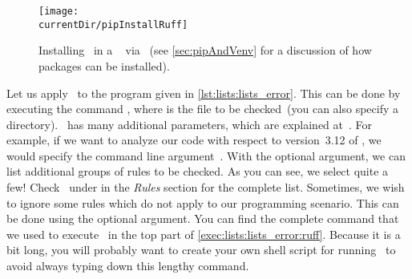 \begin{figure}%
\centering%
\texttt{[image: \\currentDir/pipInstallRuff]}%
\caption{Installing \ruff\ in a \ubuntu\  via \pip~(see \cref{sec:pipAndVenv} for a discussion of how packages can be installed).}%
\label{fig:pipInstallRuff}%
\end{figure}%
%
%
%
%
%
%
Let us apply \ruff\ to the program  given in \cref{lst:lists:lists_error}.
This can be done by executing the command , where  is the file to be checked~(you can also specify a directory).
\ruff\ has many additional parameters, which are explained at~\cite{PSF:TPPIP:R,M2022RAEFPLACFWIR}.
For example, if we want to analyze our code with respect to version~3.12 of \python, we would specify the command line argument~.
With the optional  argument, we can list additional groups of rules to be checked.
As you can see, we select quite a few!
Check~\cite{M2022RAEFPLACFWIR} under  in the \emph{Rules} section for the complete list.
Sometimes, we wish to ignore some rules which do not apply to our programming scenario.
This can be done using the optional  argument.
You can find the complete command that we used to execute \ruff\ in the top part of \cref{exec:lists:lists_error:ruff}.
Because it is a bit long, you will probably want to create your own shell script for running \ruff\ to avoid always typing down this lengthy command.

